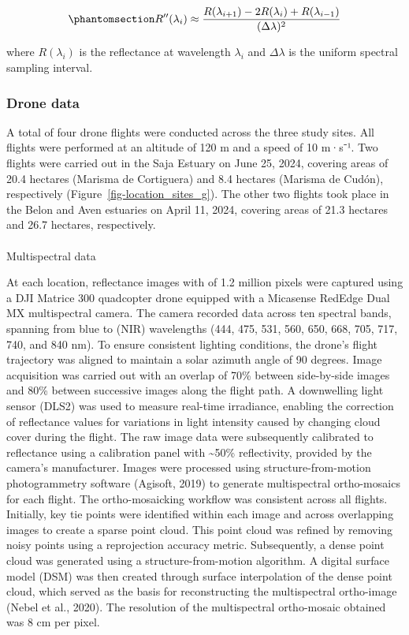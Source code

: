 \documentclass[
  letterpaper,
  11pt,
  english,
  singlespacing,
  headsepline]{MastersDoctoralThesis}
\makeatletter
\let\oldparagraph\paragraph
\renewcommand{\paragraph}{
    \@ifstar
      \xxxParagraphStar
      \xxxParagraphNoStar
  }
\newcommand{\xxxParagraphStar}[1]{\oldparagraph*{#1}\mbox{}}
\newcommand{\xxxParagraphNoStar}[1]{\oldparagraph{#1}\mbox{}}
\makeatother
\begin{document}
\begin{spacing}{1.5}
\begin{equation}\phantomsection\label{eq-SecondDerivative}{
R''(\lambda_i) \approx \frac{R(\lambda_{i+1}) - 2R(\lambda_i) + R(\lambda_{i-1})}{(\Delta \lambda)^2}
}\end{equation}

where \(R(\lambda_i)\) is the reflectance at wavelength \(\lambda_i\)
and \(\Delta \lambda\) is the uniform spectral sampling interval.

\subsubsection{Drone data}\label{drone-data}

A total of four drone flights were conducted across the three study
sites. All flights were performed at an altitude of 120 m and a speed of
10 m·s⁻¹. Two flights were carried out in the Saja Estuary on June 25,
2024, covering areas of 20.4 hectares (Marisma de Cortiguera) and 8.4
hectares (Marisma de Cudón), respectively
(Figure~\ref{fig-location_sites_g}). The other two flights took place in
the Belon and Aven estuaries on April 11, 2024, covering areas of 21.3
hectares and 26.7 hectares, respectively.

\paragraph{Multispectral data}\label{sec-photo}

At each location, reflectance images with of 1.2 million pixels were
captured using a DJI Matrice 300 quadcopter drone equipped with a
Micasense RedEdge Dual MX multispectral camera. The camera recorded data
across ten spectral bands, spanning from blue to (NIR) wavelengths (444,
475, 531, 560, 650, 668, 705, 717, 740, and 840 nm). To ensure
consistent lighting conditions, the drone's flight trajectory was
aligned to maintain a solar azimuth angle of 90 degrees. Image
acquisition was carried out with an overlap of 70\% between side-by-side
images and 80\% between successive images along the flight path. A
downwelling light sensor (DLS2) was used to measure real-time
irradiance, enabling the correction of reflectance values for variations
in light intensity caused by changing cloud cover during the flight. The
raw image data were subsequently calibrated to reflectance using a
calibration panel with \textasciitilde50\% reflectivity, provided by the
camera's manufacturer. Images were processed using structure-from-motion
photogrammetry software (Agisoft, 2019) to generate multispectral
ortho-mosaics for each flight. The ortho-mosaicking workflow was
consistent across all flights. Initially, key tie points were identified
within each image and across overlapping images to create a sparse point
cloud. This point cloud was refined by removing noisy points using a
reprojection accuracy metric. Subsequently, a dense point cloud was
generated using a structure-from-motion algorithm. A digital surface
model (DSM) was then created through surface interpolation of the dense
point cloud, which served as the basis for reconstructing the
multispectral ortho-image (Nebel et al., 2020). The resolution of the
multispectral ortho-mosaic obtained was 8 cm per pixel.


\end{spacing}
\end{document}
